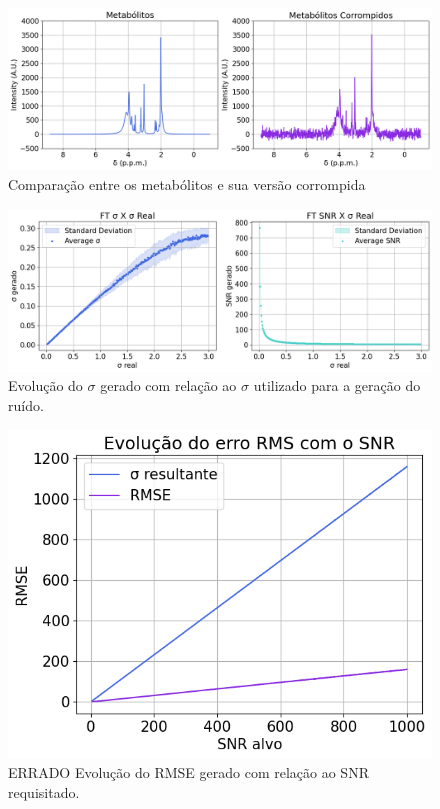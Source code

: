 \documentclass{article}
\begin{document}
\begin{figure} [H]
    \includegraphics[scale=0.37]{metabolitos-corrompidos.png}
    \caption{Comparação entre os metabólitos e sua versão corrompida}
    \label{fig:5}
\end{figure}

\begin{figure} [H]
    \includegraphics[scale=0.37]{evolucao-sigmas.png}
    \caption{Evolução do $\sigma$ gerado com relação ao $\sigma$ utilizado para a geração do ruído.}
    \label{fig:6}
\end{figure}

\begin{figure} [H]
    \includegraphics[scale=0.5]{evolucao-rmse-errado.png}
    \centering
    \caption{ERRADO Evolução do RMSE gerado com relação ao SNR requisitado.}
    \label{fig:7}
\end{figure}
\end{document}
